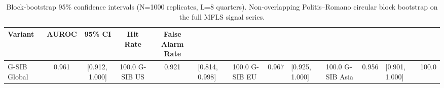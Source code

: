 \begin{table}[h]
\centering
\caption{Block-bootstrap 95\% confidence intervals (N=1000 replicates, L=8 quarters). Non-overlapping Politis--Romano circular block bootstrap on the full MFLS signal series.}
\label{tab:bootstrap_ci}
\begin{tabular}{lcccc}
\toprule
Variant & AUROC & 95\% CI & Hit Rate & False Alarm Rate \\
\midrule
G-SIB Global & 0.961 & [0.912,\,1.000] & 100.0%
G-SIB US & 0.921 & [0.814,\,0.998] & 100.0%
G-SIB EU & 0.967 & [0.925,\,1.000] & 100.0%
G-SIB Asia & 0.956 & [0.901,\,1.000] & 100.0%
\bottomrule
\end{tabular}
\end{table}